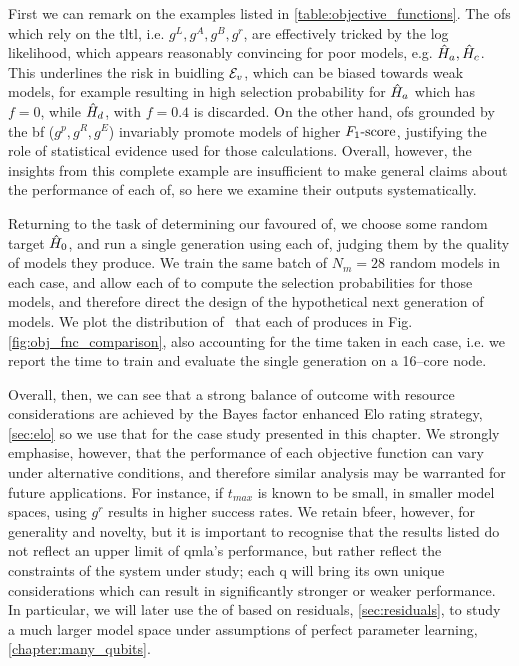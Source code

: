 First we can remark on the examples listed in \cref{table:objective_functions}. 
The \glspl{of} which rely on the \gls{tltl}, i.e. $g^L, g^A, g^B, g^r$, 
    are effectively tricked by the log likelihood, which appears reasonably convincing for 
    poor models, e.g. $\hat{H}_a, \hat{H}_c$. 
This underlines the risk in buidling ${ \mathcal{E} }_v$, which can be biased towards weak models, 
    for example resulting in high selection probability for $\hat{H}_a$ which has $f=0$, 
    while $\hat{H}_d$, with $f=0.4$ is discarded. 
On the other hand, \glspl{of} grounded by the \gls{bf} ($g^p, g^R, g^E$) invariably 
    promote models of higher $ F_{1}\text{-score} $, justifying the role of statistical evidence 
    used for those calculations. 
Overall, however, the insights from this complete example are insufficient to 
    make general claims about the performance of each \gls{of}, 
    so here we examine their outputs systematically. 
\par 

Returning to the task of determining our favoured \gls{of}, 
    we choose some random target $\hat{H}_0$, 
    and run a single generation using each \gls{of}, 
    judging them by the quality of models they produce.
We train the same batch of $N_m=28$ random models in each case, and allow each \gls{of} 
    to compute the selection probabilities for those models, 
    and therefore direct the design of the hypothetical next generation of models. 
We plot the distribution of \fs \ that each \gls{of} produces in Fig. \ref{fig:obj_fnc_comparison},
    also accounting for the time taken in each case, i.e. 
    we report the time to train and evaluate the single generation on a 16--core node.
\par

Overall, then, we can see that a strong balance of outcome with resource considerations 
    are achieved by the Bayes factor enhanced Elo rating strategy, \cref{sec:elo}
    so we use that for the case study presented in this chapter. 
We strongly emphasise, however, that the performance of each objective function
    can vary under alternative conditions, and therefore similar analysis may 
    be warranted for future applications. 
For instance, if $t_{max}$ is known to be small, 
    in smaller model spaces, using $g^r$ results in higher success rates.
We retain \gls{bfeer}, however, for generality and novelty, 
    but it is important to recognise that the results listed do not reflect
    an upper limit of \gls{qmla}'s performance, 
    but rather reflect the constraints of the system under study; 
    each \gls{q} will bring its own unique considerations which can result in 
    significantly stronger or weaker performance. 
In particular, we will later use the \gls{of} based on residuals, \cref{sec:residuals}, 
    to study a much larger model space under assumptions of perfect parameter learning, \cref{chapter:many_qubits}.



